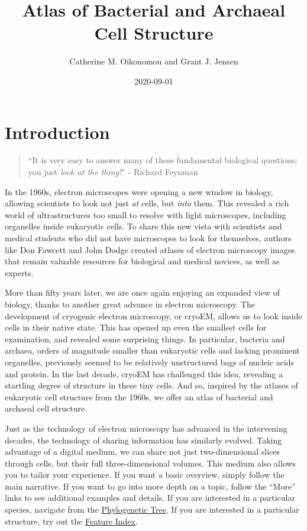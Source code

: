 \documentclass[]{tufte-book}
\title{Atlas of Bacterial and Archaeal Cell Structure}
\author{Catherine M. Oikonomou and Grant J. Jensen}
\date{2020-09-01}
\begin{document}
\maketitle



{
\setcounter{tocdepth}{1}
\tableofcontents
}

\hypertarget{introduction}{%
\chapter*{Introduction}\label{introduction}}

\begin{quote}
``It is very easy to answer many of these fundamental biological questions; you just \emph{look at the thing!}''
- Richard Feynman \citep{feynman1960}
\end{quote}

In the 1960s, electron microscopes were opening a new window in biology, allowing scientists to look not just \emph{at} cells, but \emph{into} them. This revealed a rich world of ultrastructures too small to resolve with light microscopes, including organelles inside eukaryotic cells. To share this new vista with scientists and medical students who did not have microscopes to look for themselves, authors like Don Fawcett \citep{fawcett1966} and John Dodge \citep{dodge1968} created atlases of electron microscopy images that remain valuable resources for biological and medical novices, as well as experts.

More than fifty years later, we are once again enjoying an expanded view of biology, thanks to another great advance in electron microscopy. The development of cryogenic electron microscopy, or cryoEM, allows us to look inside cells in their native state. This has opened up even the smallest cells for examination, and revealed some surprising things. In particular, bacteria and archaea, orders of magnitude smaller than eukaryotic cells and lacking prominent organelles, previously seemed to be relatively unstructured bags of nucleic acids and protein. In the last decade, cryoEM has challenged this idea, revealing a startling degree of structure in these tiny cells. And so, inspired by the atlases of eukaryotic cell structure from the 1960s, we offer an atlas of bacterial and archaeal cell structure.

Just as the technology of electron microscopy has advanced in the intervening decades, the technology of sharing information has similarly evolved. Taking advantage of a digital medium, we can share not just two-dimensional slices through cells, but their full three-dimensional volumes. This medium also allows you to tailor your experience. If you want a basic overview, simply follow the main narrative. If you want to go into more depth on a topic, follow the ``More'' links to see additional examples and details. If you are interested in a particular species, navigate from the \protect\hyperlink{tree}{Phylogenetic Tree}. If you are interested in a particular structure, try out the \protect\hyperlink{feature-index}{Feature Index}.
\end{document}
